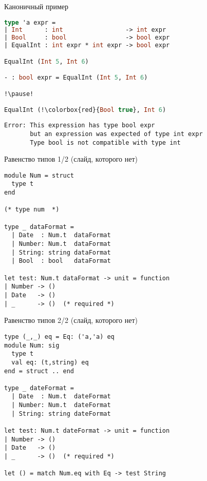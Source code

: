 \documentclass[10pt, mathserif]{beamer}
\theoremstyle{definition}
\begin{document}
\begin{frame}[fragile]{Каноничный пример}
\begin{lstlisting}[language=ocaml,mathescape=true]
type 'a expr =
| Int      : int                 -> int expr
| Bool     : bool                -> bool expr
| EqualInt : int expr * int expr -> bool expr

EqualInt (Int 5, Int 6)

- : bool expr = EqualInt (Int 5, Int 6)

!\pause!

EqualInt (!\colorbox{red}{Bool true}, Int 6)
\end{lstlisting}

\begin{verbatim}
Error: This expression has type bool expr
       but an expression was expected of type int expr
       Type bool is not compatible with type int
\end{verbatim}
\end{frame}

\begin{frame}[fragile]{Равенство типов 1/2 (слайд, которого нет)}
\begin{lstlisting}
module Num = struct
  type t
end

(* type num  *)

type _ dataFormat =
  | Date  : Num.t  dataFormat
  | Number: Num.t  dataFormat
  | String: string dataFormat
  | Bool  : bool   dataFormat

let test: Num.t dataFormat -> unit = function
| Number -> ()
| Date   -> ()
| _      -> ()  (* required *) 
\end{lstlisting}
\end{frame}

\begin{frame}[fragile]{Равенство типов 2/2 (слайд, которого нет)}
\begin{lstlisting}
type (_,_) eq = Eq: ('a,'a) eq
module Num: sig
  type t
  val eq: (t,string) eq
end = struct .. end

type _ dateFormat =
  | Date  : Num.t  dateFormat
  | Number: Num.t  dateFormat
  | String: string dateFormat

let test: Num.t dateFormat -> unit = function
| Number -> ()
| Date   -> ()
| _      -> ()  (* required *) 

let () = match Num.eq with Eq -> test String

\end{lstlisting}
\end{frame}
\end{document}
